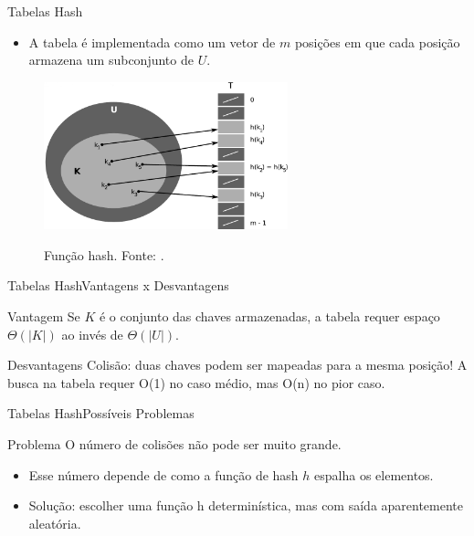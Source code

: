 \documentclass[aspectratio=169]{beamer}
\begin{document}


\begin{frame}{Tabelas Hash}
\begin{itemize}
 \item A tabela é implementada como um vetor de $m$ posições em que cada posição armazena um subconjunto de $U$.
\end{itemize}
\begin{figure}[!h]
  \centering
  \includegraphics[width=200pt]{imagens/tabela_hash.png}
  \label{fig_tabela_hash}
  \caption{Função hash. Fonte: .}
\end{figure}
\end{frame}

\begin{frame}{Tabelas Hash}{Vantagens x Desvantagens}
\begin{block}{Vantagem}
Se $K$ é o conjunto das chaves armazenadas, a tabela requer espaço $\Theta(|K|)$ ao invés de $\Theta(|U|)$.
\end{block}
\begin{block}{Desvantagens}
{\color{red} Colisão}: duas chaves podem ser mapeadas para a mesma posição!
A busca na tabela requer O(1) no caso médio, mas O(n) no pior caso.
\end{block}
\end{frame}

\begin{frame}{Tabelas Hash}{Possíveis Problemas}
\begin{block}{Problema}
O número de colisões não pode ser muito grande.
\end{block}
\begin{itemize}
 \item Esse número depende de como a função de hash $h$ espalha os elementos.
 \item {\color{red} Solução}: escolher uma função h determinística, mas com saída aparentemente aleatória.
\end{itemize}
\end{frame}
\end{document}
